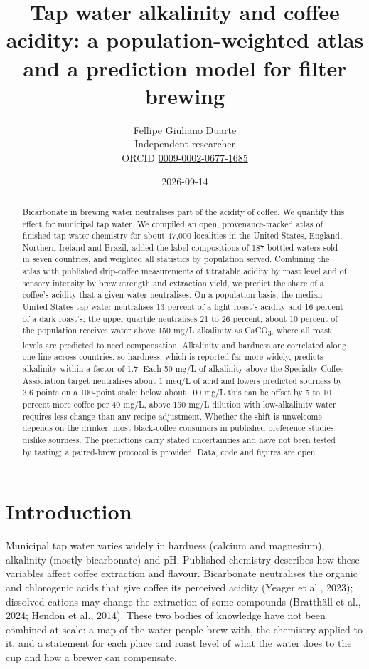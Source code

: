 \documentclass[
  a4paper,
]{article}
\title{Tap water alkalinity and coffee acidity: a population-weighted
atlas and a prediction model for filter brewing}
\author{Fellipe Giuliano Duarte\\ {\small Independent
researcher}\\ {\small ORCID \href{https://orcid.org/0009-0002-0677-1685}{0009-0002-0677-1685}}}
\date{2026-09-14}
\begin{document}
\maketitle
\begin{abstract}
Bicarbonate in brewing water neutralises part of the acidity of coffee.
We quantify this effect for municipal tap water. We compiled an open,
provenance-tracked atlas of finished tap-water chemistry for about
47,000 localities in the United States, England, Northern Ireland and
Brazil, added the label compositions of 187 bottled waters sold in seven
countries, and weighted all statistics by population served. Combining
the atlas with published drip-coffee measurements of titratable acidity
by roast level and of sensory intensity by brew strength and extraction
yield, we predict the share of a coffee's acidity that a given water
neutralises. On a population basis, the median United States tap water
neutralises 13 percent of a light roast's acidity and 16 percent of a
dark roast's; the upper quartile neutralises 21 to 26 percent; about 10
percent of the population receives water above 150 mg/L alkalinity as
CaCO\textsubscript{3}, where all roast levels are predicted to need
compensation. Alkalinity and hardness are correlated along one line
across countries, so hardness, which is reported far more widely,
predicts alkalinity within a factor of 1.7. Each 50 mg/L of alkalinity
above the Specialty Coffee Association target neutralises about 1 meq/L
of acid and lowers predicted sourness by 3.6 points on a 100-point
scale; below about 100 mg/L this can be offset by 5 to 10 percent more
coffee per 40 mg/L, above 150 mg/L dilution with low-alkalinity water
requires less change than any recipe adjustment. Whether the shift is
unwelcome depends on the drinker: most black-coffee consumers in
published preference studies dislike sourness. The predictions carry
stated uncertainties and have not been tested by tasting; a paired-brew
protocol is provided. Data, code and figures are open.
\end{abstract}


\section{Introduction}\label{introduction}

Municipal tap water varies widely in hardness (calcium and magnesium),
alkalinity (mostly bicarbonate) and pH. Published chemistry describes
how these variables affect coffee extraction and flavour. Bicarbonate
neutralises the organic and chlorogenic acids that give coffee its
perceived acidity (Yeager et al., 2023); dissolved cations may change
the extraction of some compounds (Bratthäll et al., 2024; Hendon et al.,
2014). These two bodies of knowledge have not been combined at scale: a
map of the water people brew with, the chemistry applied to it, and a
statement for each place and roast level of what the water does to the
cup and how a brewer can compensate.
\end{document}
